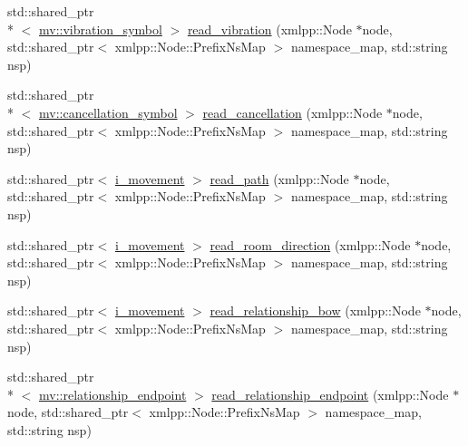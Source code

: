 \begin{DoxyCompactItemize}
\item 
std\-::shared\-\_\-ptr\\*
$<$ \hyperlink{classmae_1_1fl_1_1laban_1_1mv_1_1vibration__symbol}{mv\-::vibration\-\_\-symbol} $>$ \hyperlink{classmae_1_1fl_1_1laban_1_1internal__laban__sequence__reader_a83956caf3306fcac1f587ac87468ca58}{read\-\_\-vibration} (xmlpp\-::\-Node $\ast$node, std\-::shared\-\_\-ptr$<$ xmlpp\-::\-Node\-::\-Prefix\-Ns\-Map $>$ namespace\-\_\-map, std\-::string nsp)
\item 
std\-::shared\-\_\-ptr\\*
$<$ \hyperlink{classmae_1_1fl_1_1laban_1_1mv_1_1cancellation__symbol}{mv\-::cancellation\-\_\-symbol} $>$ \hyperlink{classmae_1_1fl_1_1laban_1_1internal__laban__sequence__reader_ab54f874a531b82c52f34f2f55cb38296}{read\-\_\-cancellation} (xmlpp\-::\-Node $\ast$node, std\-::shared\-\_\-ptr$<$ xmlpp\-::\-Node\-::\-Prefix\-Ns\-Map $>$ namespace\-\_\-map, std\-::string nsp)
\item 
std\-::shared\-\_\-ptr$<$ \hyperlink{classmae_1_1fl_1_1laban_1_1i__movement}{i\-\_\-movement} $>$ \hyperlink{classmae_1_1fl_1_1laban_1_1internal__laban__sequence__reader_ae636e74938d174875976d1108612dc53}{read\-\_\-path} (xmlpp\-::\-Node $\ast$node, std\-::shared\-\_\-ptr$<$ xmlpp\-::\-Node\-::\-Prefix\-Ns\-Map $>$ namespace\-\_\-map, std\-::string nsp)
\item 
std\-::shared\-\_\-ptr$<$ \hyperlink{classmae_1_1fl_1_1laban_1_1i__movement}{i\-\_\-movement} $>$ \hyperlink{classmae_1_1fl_1_1laban_1_1internal__laban__sequence__reader_a092ed95b7d6b07bfdf37a1998b992be3}{read\-\_\-room\-\_\-direction} (xmlpp\-::\-Node $\ast$node, std\-::shared\-\_\-ptr$<$ xmlpp\-::\-Node\-::\-Prefix\-Ns\-Map $>$ namespace\-\_\-map, std\-::string nsp)
\item 
std\-::shared\-\_\-ptr$<$ \hyperlink{classmae_1_1fl_1_1laban_1_1i__movement}{i\-\_\-movement} $>$ \hyperlink{classmae_1_1fl_1_1laban_1_1internal__laban__sequence__reader_ad51bd6b9c6d136e7fc15e53c85f19965}{read\-\_\-relationship\-\_\-bow} (xmlpp\-::\-Node $\ast$node, std\-::shared\-\_\-ptr$<$ xmlpp\-::\-Node\-::\-Prefix\-Ns\-Map $>$ namespace\-\_\-map, std\-::string nsp)
\item 
std\-::shared\-\_\-ptr\\*
$<$ \hyperlink{classmae_1_1fl_1_1laban_1_1mv_1_1relationship__endpoint}{mv\-::relationship\-\_\-endpoint} $>$ \hyperlink{classmae_1_1fl_1_1laban_1_1internal__laban__sequence__reader_ac88fd9b8e888d5c8a7570b455c92f732}{read\-\_\-relationship\-\_\-endpoint} (xmlpp\-::\-Node $\ast$node, std\-::shared\-\_\-ptr$<$ xmlpp\-::\-Node\-::\-Prefix\-Ns\-Map $>$ namespace\-\_\-map, std\-::string nsp)
\end{DoxyCompactItemize}


